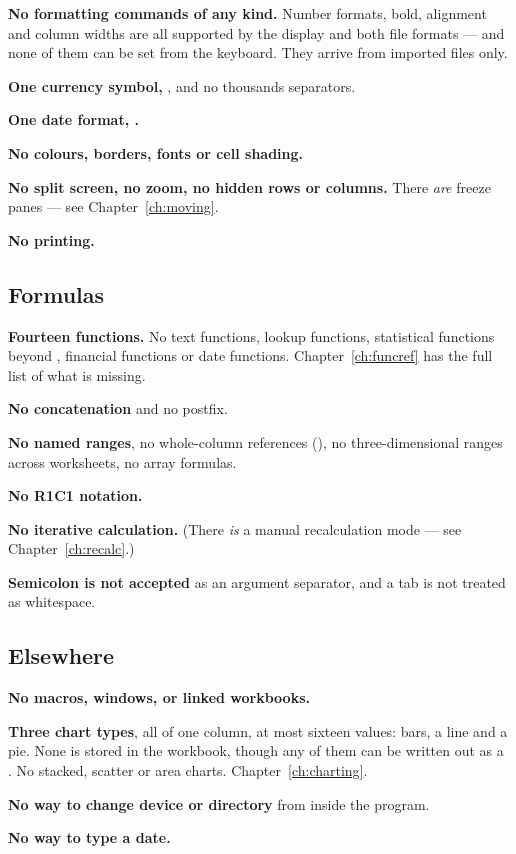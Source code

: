 \begin{ccsteps}
\item \textbf{No formatting commands of any kind.} Number formats, bold,
alignment and column widths are all supported by the display and both file
formats --- and none of them can be set from the keyboard. They arrive from
imported files only.
\item \textbf{One currency symbol, \lit{\$}}, and no thousands separators.
\item \textbf{One date format, .}
\item \textbf{No colours, borders, fonts or cell shading.}
\item \textbf{No split screen, no zoom, no hidden rows or columns.} There
\emph{are} freeze panes --- see Chapter~\ref{ch:moving}.
\item \textbf{No printing.}
\end{ccsteps}

\subsection{Formulas}

\begin{ccsteps}
\item \textbf{Fourteen functions.} No text functions, lookup functions,
statistical functions beyond , financial functions or date
functions. Chapter~\ref{ch:funcref} has the full list of what is missing.
\item \textbf{No \lit{\&} concatenation} and no \lit{\%} postfix.
\item \textbf{No named ranges}, no whole-column references (), no
three-dimensional ranges across worksheets, no array formulas.
\item \textbf{No R1C1 notation.}
\item \textbf{No iterative calculation.} (There \emph{is} a manual
recalculation mode --- see Chapter~\ref{ch:recalc}.)
\item \textbf{Semicolon is not accepted} as an argument separator, and a tab is
not treated as whitespace.
\end{ccsteps}

\subsection{Elsewhere}

\begin{ccsteps}
\item \textbf{No macros, windows, or linked workbooks.}
\item \textbf{Three chart types}, all of one column, at most sixteen values:
bars, a line and a pie. None is stored in the workbook, though any of them can
be written out as a . No stacked, scatter or area charts.
Chapter~\ref{ch:charting}.
\item \textbf{No way to change device or directory} from inside the program.
\item \textbf{No way to type a date.}
\end{ccsteps}

